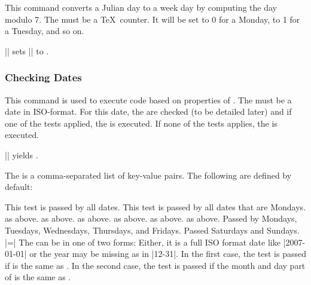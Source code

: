 \begin{command}{\pgfcalendarjuliantoweekday{}}
  This command converts a Julian day to a week day by computing the
  day modulo 7. The  must be a \TeX\
  counter. It will be set to 0 for a Monday, to 1 for a Tuesday, and
  so on.

  \example || sets
  |\mycount| to
  \the\mycount. 
\end{command}


\subsubsection{Checking Dates}


\begin{command}{\pgfcalendarifdate{}}
  This command is used to execute code based on properties of
  . The \meta{date} must be a date in ISO-format. For
  this date, the \meta{tests} are checked (to be detailed later)
  and if one of the tests applied, the \meta{code} is
  executed. If none of the tests applies, the  is
  executed.

  \example ||
  yields \texttt{\pgfcalendarifdate{2007-02-07}{Wednesday}{Is a
      Wednesday}{Is not a Wednesday}}.

  The  is a comma-separated list of key-value
  pairs. The following are defined by default:
  \begin{itemize}
   This test is passed by all dates.
   This test is passed by all dates that
  are Mondays.
   as above.
   as above.
   as above.
   as above.
   as above.
   as above.
   Passed by Mondays, Tuesdays,
  Wednesdays, Thursdays, and Fridays.
   Passed Saturdays and Sundays. 
  |=| The 
  can be in one of two forms: Either, it is a full ISO format date
  like |2007-01-01| or the year may be missing as in |12-31|. In the
  first case, the test is passed if  is the same as
  . In the second case, the test is passed if the
  month and day part of \meta{date} is the same as .


\end{itemize}
\end{command}
